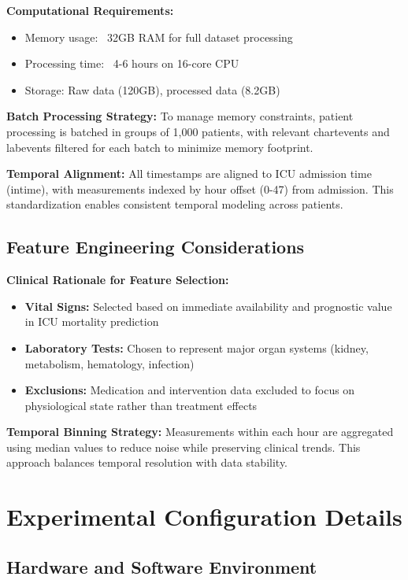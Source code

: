 \documentclass[letterpaper]{article}
\begin{document}
\textbf{Computational Requirements:}
\begin{itemize}
    \item Memory usage: ~32GB RAM for full dataset processing
    \item Processing time: ~4-6 hours on 16-core CPU
    \item Storage: Raw data (120GB), processed data (8.2GB)
\end{itemize}

\textbf{Batch Processing Strategy:}
To manage memory constraints, patient processing is batched in groups of 1,000 patients, with relevant chartevents and labevents filtered for each batch to minimize memory footprint.

\textbf{Temporal Alignment:}
All timestamps are aligned to ICU admission time (intime), with measurements indexed by hour offset (0-47) from admission. This standardization enables consistent temporal modeling across patients.

\subsection{Feature Engineering Considerations}

\textbf{Clinical Rationale for Feature Selection:}
\begin{itemize}
    \item \textbf{Vital Signs:} Selected based on immediate availability and prognostic value in ICU mortality prediction
    \item \textbf{Laboratory Tests:} Chosen to represent major organ systems (kidney, metabolism, hematology, infection)
    \item \textbf{Exclusions:} Medication and intervention data excluded to focus on physiological state rather than treatment effects
\end{itemize}

\textbf{Temporal Binning Strategy:}
Measurements within each hour are aggregated using median values to reduce noise while preserving clinical trends. This approach balances temporal resolution with data stability.

\section{Experimental Configuration Details}

\subsection{Hardware and Software Environment}
\end{document}
